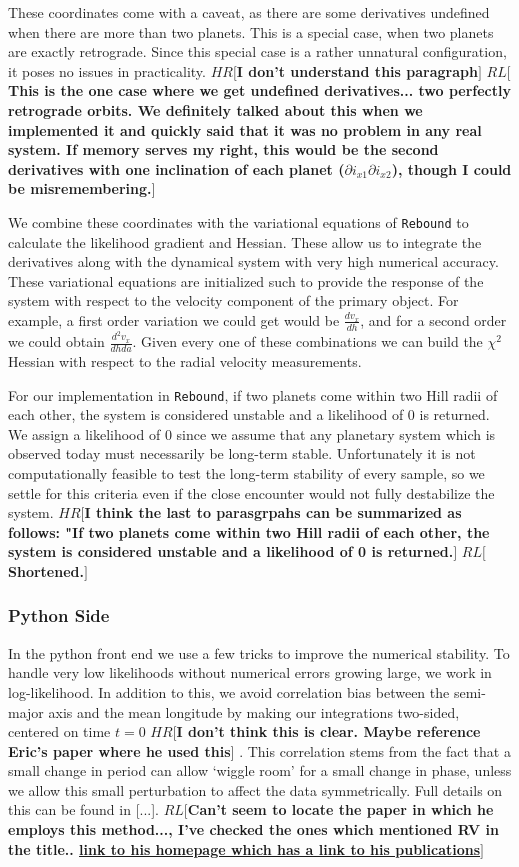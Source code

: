 \documentclass{aa}
\def\memohr#1{\color{blue}$HR[${\bf #1}$]$ \color{black}}
\def\memorl#1{\color{gray}$RL[${\bf #1}$]$ \color{black}}
\begin{document}
These coordinates come with a caveat, as there are some derivatives undefined when there are more than two planets. This is a special case, when two planets are exactly retrograde. Since this special case is a rather unnatural configuration, it poses no issues in practicality.
\memohr{I don't understand this paragraph}
\memorl{This is the one case where we get undefined derivatives... two perfectly retrograde orbits. We definitely talked about this when we implemented it and quickly said that it was no problem in any real system. If memory serves my right, this would be the second derivatives with one inclination of each planet ($\partial i_{x1} \partial i_{x2}$), though I could be misremembering.}

We combine these coordinates with the variational equations of \texttt{Rebound} to calculate the likelihood gradient and Hessian. 
These allow us to integrate the derivatives along with the dynamical system with very high numerical accuracy. 
These variational equations are initialized such to provide the response of the system with respect to the velocity component of the primary object. 
For example, a first order variation we could get would be $\frac{dv_x}{dh}$, and for a second order we could obtain $\frac{d^2v_x}{dhda}$. 
Given every one of these combinations we can build the $\chi^2$ Hessian with respect to the radial velocity measurements.

For our implementation in \texttt{Rebound}, if two planets come within two Hill radii of each other, the system is considered unstable and a likelihood of 0 is returned. 
We assign a likelihood of 0 since we assume that any planetary system which is observed today must necessarily be long-term stable. 
Unfortunately it is not computationally feasible to test the long-term stability of every sample, so we settle for this criteria even if the close encounter would not fully destabilize the system.
\memohr{I think the last to parasgrpahs can be summarized as follows: "If two planets come within two Hill radii of each other, the system is considered unstable and a likelihood of 0 is returned.}
\memorl{Shortened.}

\subsubsection{Python Side}
In the python front end we use a few tricks to improve the numerical stability. 
To handle very low likelihoods without numerical errors growing large, we work in log-likelihood. 
In addition to this, we avoid correlation bias between the semi-major axis and the mean longitude by making our integrations two-sided, centered on time $t=0$ \memohr{I don't think this is clear. Maybe reference Eric's paper where he used this}.
This correlation stems from the fact that a small change in period can allow `wiggle room' for a small change in phase, unless we allow this small perturbation to affect the data symmetrically.
Full details on this can be found in [...].
\memorl{Can't seem to locate the paper in which he employs this method..., I've checked the ones which mentioned RV in the title.. \href{http://astro.psu.edu/people/ebf11}{link to his homepage which has a link to his publications}}
\end{document}
